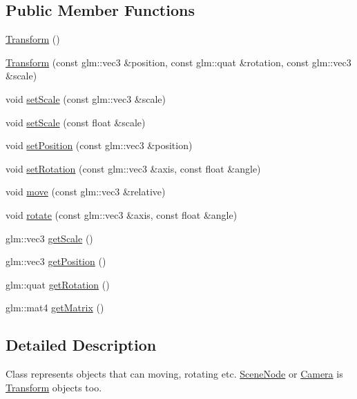 \subsection*{Public Member Functions}
\begin{DoxyCompactItemize}
\item 
\mbox{\hyperlink{classthunder_1_1_transform_a5c734aa44dc5ec997777a823f4945267}{Transform}} ()
\item 
\mbox{\hyperlink{classthunder_1_1_transform_ac52d02022697715e0aaa3ce7a2228921}{Transform}} (const glm\+::vec3 \&position, const glm\+::quat \&rotation, const glm\+::vec3 \&scale)
\item 
void \mbox{\hyperlink{classthunder_1_1_transform_a8fe28dfa249e9b20bdc41fb5831fe365}{set\+Scale}} (const glm\+::vec3 \&scale)
\item 
void \mbox{\hyperlink{classthunder_1_1_transform_a8b94987c46bf380b9507a880ec64f2cc}{set\+Scale}} (const float \&scale)
\item 
void \mbox{\hyperlink{classthunder_1_1_transform_a7ce46713d4f7b0f503b406634a9bd437}{set\+Position}} (const glm\+::vec3 \&position)
\item 
void \mbox{\hyperlink{classthunder_1_1_transform_a8ccebf81e7a314ffe11cf461e56a9f22}{set\+Rotation}} (const glm\+::vec3 \&axis, const float \&angle)
\item 
void \mbox{\hyperlink{classthunder_1_1_transform_a02c705563b8f94336f79bd3cd5cbea76}{move}} (const glm\+::vec3 \&relative)
\item 
void \mbox{\hyperlink{classthunder_1_1_transform_ae178b3c22200182a7694b83ec34a65f5}{rotate}} (const glm\+::vec3 \&axis, const float \&angle)
\item 
glm\+::vec3 \mbox{\hyperlink{classthunder_1_1_transform_af70a68891b7b9158f2a1c4f02ad057b0}{get\+Scale}} ()
\item 
glm\+::vec3 \mbox{\hyperlink{classthunder_1_1_transform_ac02987b10bd5f41890a23af03318c324}{get\+Position}} ()
\item 
glm\+::quat \mbox{\hyperlink{classthunder_1_1_transform_a7f846cbe6b4ce50cd5e22b8fdd51c1ad}{get\+Rotation}} ()
\item 
glm\+::mat4 \mbox{\hyperlink{classthunder_1_1_transform_a9fac68be9d4eef2ae3889cc35b6c7a54}{get\+Matrix}} ()
\end{DoxyCompactItemize}


\subsection{Detailed Description}
Class represents objects that can moving, rotating etc. \mbox{\hyperlink{classthunder_1_1_scene_node}{Scene\+Node}} or \mbox{\hyperlink{classthunder_1_1_camera}{Camera}} is \mbox{\hyperlink{classthunder_1_1_transform}{Transform}} objects too. 

